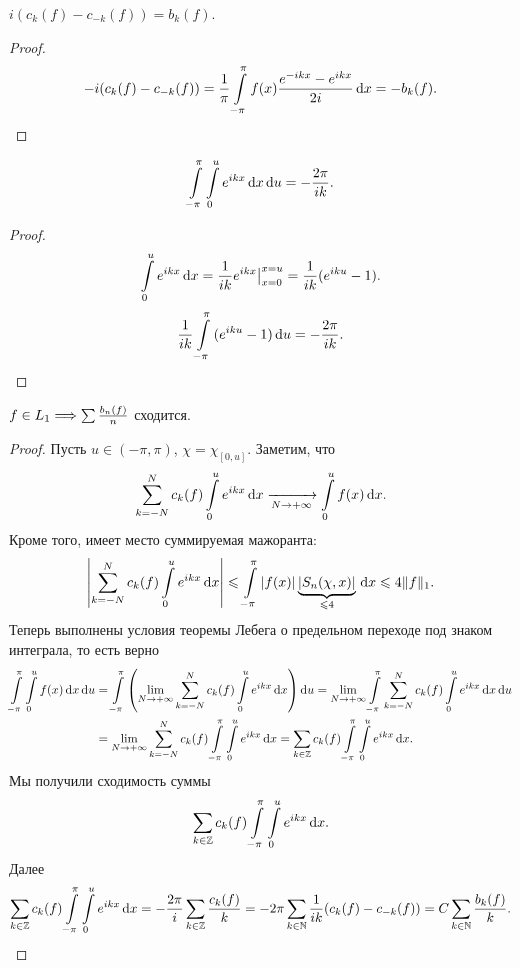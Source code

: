 \begin{remark}
    $i(c_k(f) - c_{-k}(f)) = b_k(f)$.
\end{remark}
\begin{proof}
    \[
        -i(c_k(f) - c_{-k}(f)) = \frac{1}{\pi} \intl_{-\pi}^\pi{f(x)
        \frac{e^{-ikx} - e^{ikx}}{2i} \dd x} = -b_k(f) 
    .\]
\end{proof}

\begin{remark}
    \[
        \intl_{-\pi}^\pi{\intl_0^u{e^{ikx} \dd x} \dd u} = -\frac{2\pi}{ik}
    .\]
\end{remark}
\begin{proof}
    \[
        \intl_0^u{e^{ikx} \dd x} = \frac{1}{ik}e^{ikx}\big|_{x = 0}^{x = u}
        = \frac{1}{ik}(e^{iku} - 1)
    .\]
    \[
        \frac{1}{ik}\intl_{-\pi}^\pi{(e^{iku} - 1) \dd u} = -\frac{2\pi}{ik}
    .\]
\end{proof}

\begin{corollary}
    $f \in L_1 \Lra \sum{\frac{b_n(f)}{n}}$ сходится.
\end{corollary}
\begin{proof}
    Пусть $u \in (-\pi, \pi)$, $\chi = \chi_{[0, u]}$. Заметим, что
    \[
        \sum_{k = -N}^N{c_k(f) \intl_0^u{e^{ikx} \dd x}} \xrightarrow[N \to +\infty]{}
        \intl_0^u{f(x) \dd x}
    .\]
    Кроме того, имеет место суммируемая мажоранта:
    \[
        \abs*{\sum_{k = -N}^N{c_k(f) \intl_0^u{e^{ikx} \dd x}}} \leqslant
        \intl_{-\pi}^\pi{|f(x)| \underbrace{|S_n(\chi, x)|}_{\leqslant 4} \dd x}
        \leqslant 4 \norm{f}_1
    .\]
    Теперь выполнены условия теоремы Лебега о предельном переходе под знаком
    интеграла, то есть верно
    \begin{align*}
        \intl_{-\pi}^\pi{\intl_0^u{f(x) \dd x} \dd u} 
        &= \intl_{-\pi}^\pi{
            \parens*{\lim_{N \to +\infty}{\sum_{k = -N}^N{c_k(f) \intl_0^u{e^{ikx}
        \dd x}}}} \dd u} 
        = \lim_{N \to +\infty}{\intl_{-\pi}^\pi{\sum_{k = -N}^N{
        c_k(f) \intl_0^u{e^{ikx} \dd x}} \dd u}} \\
        &= \lim_{N \to +\infty}{\sum_{k = -N}^N{c_k(f) \intl_{-\pi}^\pi{
                \intl_0^u{e^{ikx}\dd x}}}} = \sum_{k \in \bZ}{c_k(f) \intl_{-\pi}^\pi{
        \intl_0^u{e^{ikx} \dd x}}}
    .\end{align*}
    Мы получили сходимость суммы
    \[
        \sum_{k \in \bZ}{c_k(f) \intl_{-\pi}^\pi{\intl_0^u{e^{ikx} \dd x}}}
    .\]
    Далее
    \begin{align*}
        \sum_{k \in \bZ}{c_k(f) \intl_{-\pi}^\pi{\intl_0^u{e^{ikx} \dd x}}} =
        -\frac{2\pi}{i} \sum_{k \in \bZ}{\frac{c_k(f)}{k}} =
        -2\pi \sum_{k \in \bN}{\frac{1}{ik} (c_k(f) - c_{-k}(f))}
        = C \sum_{k \in \bN}{\frac{b_k(f)}{k}}
    .\end{align*}
\end{proof}

